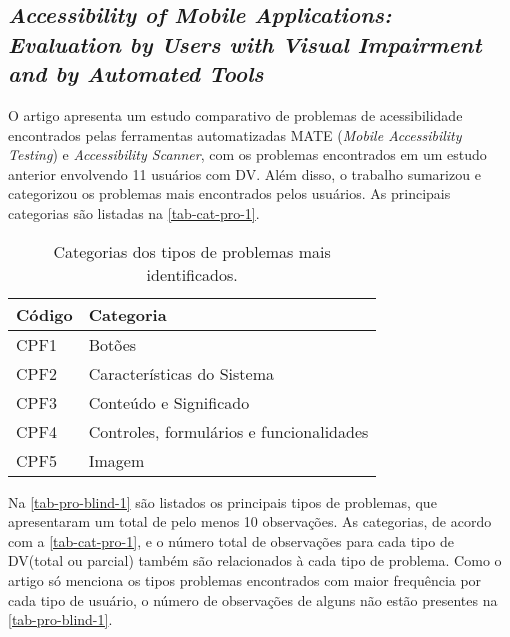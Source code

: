 \subsection{\emph{Accessibility of Mobile Applications: Evaluation by Users with Visual Impairment and by Automated Tools}}

O artigo apresenta um estudo comparativo de problemas de acessibilidade encontrados pelas ferramentas automatizadas MATE (\emph{Mobile Accessibility Testing}) e \emph{Accessibility Scanner}, com os problemas encontrados em um estudo anterior envolvendo 11 usuários com DV\@.
Além disso, o trabalho sumarizou e categorizou os problemas mais encontrados pelos usuários.
As principais categorias são listadas na \autoref{tab-cat-pro-1}.

\begin{table}[htb]
  \begin{center}
    \ABNTEXfontereduzida
    \caption{Categorias dos tipos de problemas mais identificados.}
    \label{tab-cat-pro-1}
    \begin{tabular}{p{2.0cm}|p{7cm}}
      \textbf{Código} & \textbf{Categoria}                       \\
      \hline
      CPF1            & Botões                                   \\
      \hline
      CPF2            & Características do Sistema               \\
      \hline
      CPF3            & Conteúdo e Significado                   \\
      \hline
      CPF4            & Controles, formulários e funcionalidades \\
      \hline
      CPF5            & Imagem                                   \\
    \end{tabular}
  \end{center}
\end{table}

Na \autoref{tab-pro-blind-1} são listados os principais tipos de problemas, que apresentaram um total de pelo menos 10 observações.
As categorias, de acordo com a \autoref{tab-cat-pro-1}, e o número total de observações para cada tipo de DV\@ (total ou parcial) também são relacionados à cada tipo de problema.
Como o artigo só menciona os tipos problemas encontrados com maior frequência por cada tipo de usuário, o número de observações de alguns não estão presentes na \autoref{tab-pro-blind-1}.


